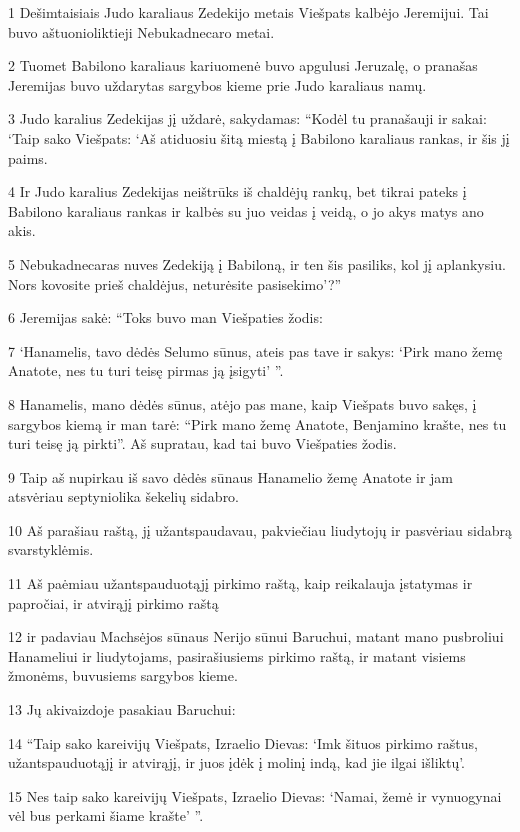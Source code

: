\par 1 Dešimtaisiais Judo karaliaus Zedekijo metais Viešpats kalbėjo Jeremijui. Tai buvo aštuonioliktieji Nebukadnecaro metai. 
\par 2 Tuomet Babilono karaliaus kariuomenė buvo apgulusi Jeruzalę, o pranašas Jeremijas buvo uždarytas sargybos kieme prie Judo karaliaus namų. 
\par 3 Judo karalius Zedekijas jį uždarė, sakydamas: “Kodėl tu pranašauji ir sakai: ‘Taip sako Viešpats: ‘Aš atiduosiu šitą miestą į Babilono karaliaus rankas, ir šis jį paims. 
\par 4 Ir Judo karalius Zedekijas neištrūks iš chaldėjų rankų, bet tikrai pateks į Babilono karaliaus rankas ir kalbės su juo veidas į veidą, o jo akys matys ano akis. 
\par 5 Nebukadnecaras nuves Zedekiją į Babiloną, ir ten šis pasiliks, kol jį aplankysiu. Nors kovosite prieš chaldėjus, neturėsite pasisekimo’?” 
\par 6 Jeremijas sakė: “Toks buvo man Viešpaties žodis: 
\par 7 ‘Hanamelis, tavo dėdės Selumo sūnus, ateis pas tave ir sakys: ‘Pirk mano žemę Anatote, nes tu turi teisę pirmas ją įsigyti’ ”. 
\par 8 Hanamelis, mano dėdės sūnus, atėjo pas mane, kaip Viešpats buvo sakęs, į sargybos kiemą ir man tarė: “Pirk mano žemę Anatote, Benjamino krašte, nes tu turi teisę ją pirkti”. Aš supratau, kad tai buvo Viešpaties žodis. 
\par 9 Taip aš nupirkau iš savo dėdės sūnaus Hanamelio žemę Anatote ir jam atsvėriau septyniolika šekelių sidabro. 
\par 10 Aš parašiau raštą, jį užantspaudavau, pakviečiau liudytojų ir pasvėriau sidabrą svarstyklėmis. 
\par 11 Aš paėmiau užantspauduotąjį pirkimo raštą, kaip reikalauja įstatymas ir papročiai, ir atvirąjį pirkimo raštą 
\par 12 ir padaviau Machsėjos sūnaus Nerijo sūnui Baruchui, matant mano pusbroliui Hanameliui ir liudytojams, pasirašiusiems pirkimo raštą, ir matant visiems žmonėms, buvusiems sargybos kieme. 
\par 13 Jų akivaizdoje pasakiau Baruchui: 
\par 14 “Taip sako kareivijų Viešpats, Izraelio Dievas: ‘Imk šituos pirkimo raštus, užantspauduotąjį ir atvirąjį, ir juos įdėk į molinį indą, kad jie ilgai išliktų’. 
\par 15 Nes taip sako kareivijų Viešpats, Izraelio Dievas: ‘Namai, žemė ir vynuogynai vėl bus perkami šiame krašte’ ”. 
